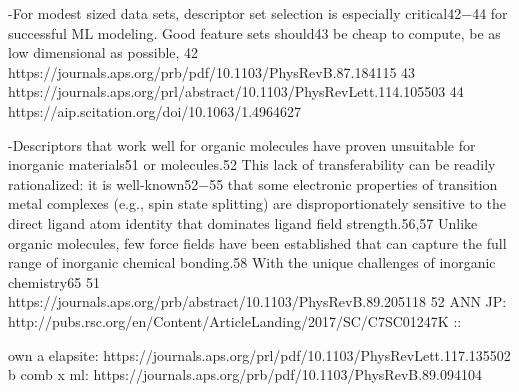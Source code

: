 \documentclass{article}
\begin{document}
-For modest sized data sets, descriptor
set selection is especially critical42−44 for successful ML
modeling. Good feature sets should43 be cheap to compute,
be as low dimensional as possible, 
42 https://journals.aps.org/prb/pdf/10.1103/PhysRevB.87.184115
43 https://journals.aps.org/prl/abstract/10.1103/PhysRevLett.114.105503
44 https://aip.scitation.org/doi/10.1063/1.4964627

-Descriptors that work well for organic molecules have proven
unsuitable for inorganic materials51 or molecules.52 This lack of
transferability can be readily rationalized: it is well-known52−55
that some electronic properties of transition metal complexes
(e.g., spin state splitting) are disproportionately sensitive to the
direct ligand atom identity that dominates ligand field
strength.56,57 Unlike organic molecules, few force fields have
been established that can capture the full range of inorganic
chemical bonding.58 
With the unique challenges of inorganic chemistry65
51 https://journals.aps.org/prb/abstract/10.1103/PhysRevB.89.205118
52 ANN JP: http://pubs.rsc.org/en/Content/ArticleLanding/2017/SC/C7SC01247K
::








own
a elapsite: https://journals.aps.org/prl/pdf/10.1103/PhysRevLett.117.135502
b comb x ml: https://journals.aps.org/prb/pdf/10.1103/PhysRevB.89.094104
\end{document}
